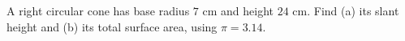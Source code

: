 A right circular cone has base radius $7$ cm and height $24$ cm. Find (a) its slant height and (b) its total surface area, using $\pi=3.14$.
